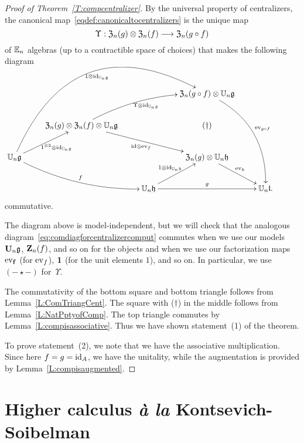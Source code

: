 \documentclass[11pt]{amsart}
\numberwithin{equation}{section}
\begin{document}
\begin{proof}[Proof of Theorem~\ref{T:compcentralizer}]
By the universal property of centralizers, 
the canonical map~\eqref{eqdef:canonicaltocentralizers} is the unique map 
\[ 
\Upsilon: {\frak Z}_n(g) \otimes {\frak Z}_n(f) \longrightarrow {\frak Z}_n(g\circ f)
\] 
of $\mathbb E_n$ algebras (up to a contractible space of choices) that makes the following diagram
\begin{equation}
\label{eq:comdiagforcentralizercomput}
\xymatrix{
&   &&  
{\frak Z}_n(g\circ f) \otimes  \UU_n \fg  \ar@/^{2pc}/[dddr]^{\ev_{g\circ f}}\\
&{\frak Z}_n(g) \otimes  {\frak Z}_n(f) \otimes \UU_n \fg \ar@/^{1pc}/[rru]_{ \Upsilon \otimes \id_{\UU_n \fg}} \ar[rrd]_{\id\otimes \ev_{f}}
&& (\dagger)
& & \\
\UU_n \fg \ar[ur]_{1^{\otimes 2}\otimes \id_{\UU_n \fg}} \ar@/_{1pc}/[rrd]^{f} \ar@/^{6pc}/[rrruu]_{1\otimes \id_{\UU_n \fg}} &&&
{\frak Z}_n(g) \otimes \UU_n \fh \ar[rd]^{\ev_{h}}  &\\
&& \UU_n \fh \ar[rr]^{g} \ar[ur]^{1\otimes \id_{\UU_n \fh}} && \UU_n \fl .
}
\end{equation}
commutative.

The diagram above is model-independent,
but we will check that the analogous diagram~\eqref{eq:comdiagforcentralizercomput} commutes when we use our models $\mathbf U_n \mathfrak g$, $\mathbf Z_n(f)$, and so on for the objects and when we use our factorization maps ${\rm ev}_{{\bf f}}$ (for ${\rm ev}_f$), ${\bf 1}$ (for the unit elements $1$),  and so on.
In particular, we use $(-\star-)$ for~$\Upsilon$.

The commutativity of the bottom square and bottom triangle follows from Lemma~\ref{L:ComTriangCent}.
The square with ($\dagger$) in the middle follows from Lemma~\ref{L:NatPptyofComp}.
The top triangle commutes by Lemma~\ref{L:compisassociative}. 
Thus we have shown statement~(1) of the theorem.

To prove statement~(2), we note that we have the associative multiplication.
Since here $f=g={\rm id}_A$, we have the unitality,
while the augmentation is provided by Lemma~\ref{L:compisaugmented}.
\end{proof}

\section{Higher calculus {\it \`a la} Kontsevich-Soibelman}
\label{sec: TT}
\end{document}
